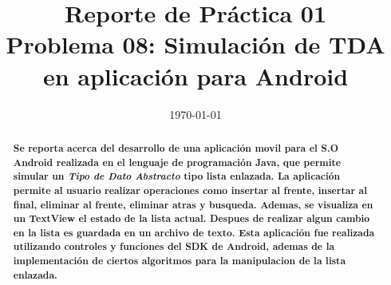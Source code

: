 \documentclass[conference]{IEEEtran}
\date{\specialdate\today}
\begin{document}
%
%
%

\newcommand{\breite}{0.9} %
\newcommand{\RelacionFiguradoscolumnas}{0.9}
\newcommand{\RelacionFiguradoscolumnasPuntoCinco}{0.45}




\title{Reporte de Práctica 01 \\ Problema 08: Simulación de TDA en aplicación para Android}

\author{
}



\maketitle
\begin{abstract} 
\textbf{Se reporta acerca del desarrollo de una aplicación movil para el S.O Android realizada en el lenguaje de programación Java, que permite simular un \textit{Tipo de Dato Abstracto} tipo lista enlazada. La aplicación permite al usuario realizar operaciones como insertar al frente, insertar al final, eliminar al frente, eliminar atras y busqueda. Ademas, se visualiza en un TextView el estado de la lista actual. Despues de realizar algun cambio en la lista es guardada en un archivo de texto. Esta aplicación fue realizada utilizando controles y funciones del SDK de Android, ademas de la implementación de ciertos algoritmos para la manipulacion de la lista enlazada.} 

\end{abstract}
\end{document}
